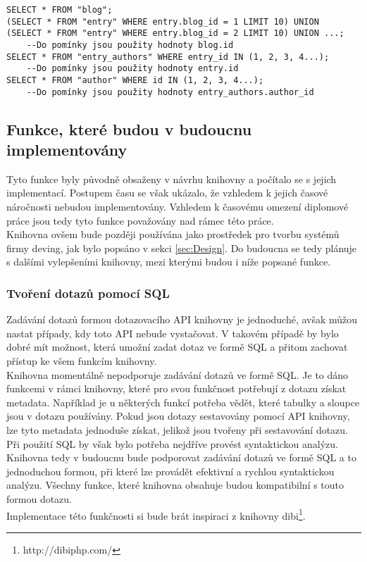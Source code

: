 \documentclass[ing,male,java,dept456]{diploma}						%
\begin{document}
\begin{lstlisting}[style=customsql, label=src:sql-selectin, caption={Dotazy vygenerované výpisem \ref{src:imp-selectin}}]
SELECT * FROM "blog";
(SELECT * FROM "entry" WHERE entry.blog_id = 1 LIMIT 10) UNION  (SELECT * FROM "entry" WHERE entry.blog_id = 2 LIMIT 10) UNION ...; 
	--Do pomínky jsou použity hodnoty blog.id
SELECT * FROM "entry_authors" WHERE entry_id IN (1, 2, 3, 4...); 
	--Do pomínky jsou použity hodnoty entry.id
SELECT * FROM "author" WHERE id IN (1, 2, 3, 4...);
	--Do pomínky jsou použity hodnoty entry_authors.author_id
\end{lstlisting}

\subsection{Funkce, které budou v budoucnu implementovány}

Tyto funkce byly původně obsaženy v návrhu knihovny a počítalo se s jejich implementací. Postupem času se však ukázalo, že vzhledem k jejich časové náročnosti nebudou implementovány. Vzhledem k časovému omezení diplomové práce jsou tedy tyto funkce považovány nad rámec této práce. \\
Knihovna ovšem bude později používána jako prostředek pro tvorbu systémů firmy deving, jak bylo popsáno v sekci \ref{sec:Design}. Do budoucna se tedy plánuje s dalšími vylepšeními knihovny, mezi kterými budou i níže popsané funkce.

\subsubsection{Tvoření dotazů pomocí SQL}

Zadávání dotazů formou dotazovacího API knihovny je jednoduché, avšak můžou nastat případy, kdy toto API nebude vystačovat. V takovém případě by bylo dobré mít možnost, která umožní zadat dotaz ve formě SQL a přitom zachovat přístup ke všem funkcím  knihovny. \\
Knihovna momentálně nepodporuje zadávání dotazů ve formě SQL. Je to dáno funkcemi v rámci knihovny, které pro svou funkčnost potřebují z dotazu získat metadata. Například je u některých funkcí potřeba vědět, které tabulky a sloupce jsou v dotazu používány. Pokud jsou dotazy sestavovány pomocí API knihovny, lze tyto metadata jednoduše získat, jelikož jsou tvořeny při sestavování dotazu. Při použití SQL by však bylo potřeba nejdříve provést syntaktickou analýzu. \\
Knihovna tedy v budoucnu bude podporovat zadávání dotazů ve formě SQL a to jednoduchou formou, při které lze provádět efektivní a rychlou syntaktickou analýzu. Všechny funkce, které knihovna obsahuje budou kompatibilní s touto formou dotazu. \\
Implementace této funkčnosti si bude brát inspiraci z knihovny dibi\footnote{http://dibiphp.com/}.
\end{document}
